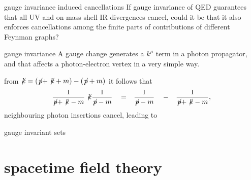 \begin{frame}{gauge invariance induced cancellations}
If gauge invariance of QED guarantees that all UV and on-mass shell IR
divergences cancel, could it be that it also enforces cancellations among
the finite parts of contributions of different Feynman graphs?
\end{frame}

\begin{frame}{gauge invariance}
A gauge change generates a $k^\mu$ term in a photon propagator,
 and that affects a photon-electron vertex in a very simple way.

\medskip
from \(
\not\!{k} = (\not\!{p}+\not\!{k}+m) - (\not\!{p}+m)
\)
it follows that
\begin{align}
  \begin{tabular}{ccccc}
$\!{\begin{aligned}\frac{1}{\not\!{p}+\not\!{k}-m}\not\!{k}\frac{1}{\not\!{p}-m}\end{aligned}}$ &
$=$ &    $\!{\begin{aligned}\frac{1}{\not\!{p}-m}\end{aligned}}$ &
$-$ &    $\!{\begin{aligned}\frac{1}{\not\!{p}+\not\!{k}-m},\end{aligned}}$
  \end{tabular}
  \nnu %
\end{align}
neighbouring photon insertions cancel, leading to

\vfill\hfill \textcolor{blue!90!black}{gauge invariant sets}
\end{frame}

\section[spacetime field theory]
 {spacetime field theory}
\label{spacetimeFT}

